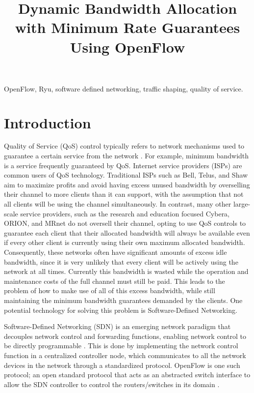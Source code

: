 \documentclass[accepted,single]{gipaper}
\title{Dynamic Bandwidth Allocation with Minimum Rate Guarantees Using OpenFlow}
\affiliation{
    Department of Computer Science \\
    University of Calgary
}
\begin{document}
\begin{keywords}
OpenFlow, Ryu, software defined networking, traffic shaping, quality of service.
\end{keywords}

\section{Introduction}
\label{intro}

Quality of Service (QoS) control typically refers to network mechanisms used to guarantee a certain service from the network \cite{Krishna:2016}. For example, minimum bandwidth is a service frequently guaranteed by QoS. Internet service providers (ISPs) are common users of QoS technology. Traditional ISPs such as Bell, Telus, and Shaw aim to maximize profits and avoid having excess unused bandwidth by overselling their channel to more clients than it can support, with the assumption that not all clients will be using the channel simultaneously. In contrast, many other large-scale service providers, such as the research and education focused Cybera, ORION, and MRnet do not oversell their channel, opting to use QoS controls to guarantee each client that their allocated bandwidth will always be available even if every other client is currently using their own maximum allocated bandwidth. Consequently, these networks often have significant amounts of excess idle bandwidth, since it is very unlikely that every client will be actively using the network at all times. Currently this bandwidth is wasted while the operation and maintenance costs of the full channel must still be paid. This leads to the problem of how to make use of all of this excess bandwidth, while still maintaining the minimum bandwidth guarantees demanded by the clients. One potential technology for solving this problem
 is Software-Defined Networking.

Software-Defined Networking (SDN) is an emerging network paradigm that decouples network control and forwarding functions, enabling network control to be directly programmable \cite{opennetworking}. This is done by implementing the network control function in a centralized controller node, which communicates to all the network devices in the network through a standardized protocol. OpenFlow is one such protocol; an open standard protocol that acts as an abstracted switch interface to allow the SDN controller to control the routers/switches in its domain \cite{sdx}.
\end{document}
